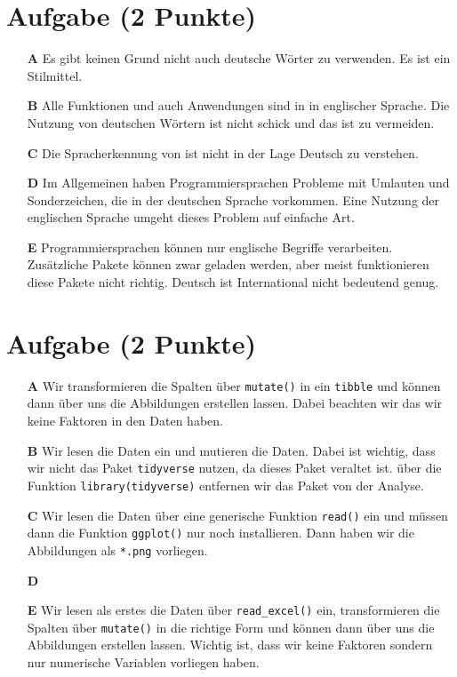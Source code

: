 \documentclass[a4paper, 9pt]{scrartcl}\usepackage[]{graphicx}\usepackage[]{xcolor}
\begin{document}
\section{Aufgabe \hfill (2 Punkte)}







\begin{enumerate}
\item [\textbf{A} \msquare] Es gibt keinen Grund nicht auch deutsche Wörter zu verwenden. Es ist ein Stilmittel.
\item [\textbf{B} \msquare] Alle Funktionen und auch Anwendungen sind in \Rlogo in englischer Sprache. Die Nutzung von deutschen Wörtern ist nicht schick und das ist zu vermeiden.
\item [\textbf{C} \msquare] Die Spracherkennung von \Rlogo ist nicht in der Lage Deutsch zu verstehen.
\item [\textbf{D} \msquare] Im Allgemeinen haben Programmiersprachen Probleme mit Umlauten und Sonderzeichen, die in der deutschen Sprache vorkommen. Eine Nutzung der englischen Sprache umgeht dieses Problem auf einfache Art.
\item [\textbf{E} \msquare] Programmiersprachen können nur englische Begriffe verarbeiten. Zusätzliche Pakete können zwar geladen werden, aber meist funktionieren diese Pakete nicht richtig. Deutsch ist International nicht bedeutend genug.
\end{enumerate}

\section{Aufgabe \hfill (2 Punkte)}







\begin{enumerate}
\item [\textbf{A} \msquare] Wir transformieren die Spalten über \texttt{mutate()} in ein \texttt{tibble} und können dann über  uns die Abbildungen erstellen lassen. Dabei beachten wir das wir keine Faktoren in den Daten haben.
\item [\textbf{B} \msquare] Wir lesen die Daten ein und mutieren die Daten. Dabei ist wichtig, dass wir nicht das Paket \texttt{tidyverse} nutzen, da dieses Paket veraltet ist. über die Funktion \texttt{library(tidyverse)} entfernen wir das Paket von der Analyse.
\item [\textbf{C} \msquare] Wir lesen die Daten über eine generische Funktion \texttt{read()} ein und müssen dann die Funktion \texttt{ggplot()} nur noch installieren. Dann haben wir die Abbildungen als \texttt{*.png} vorliegen.
\item [\textbf{D} \msquare] 
\item [\textbf{E} \msquare] Wir lesen als erstes die Daten über \texttt{read\_excel()} ein, transformieren die Spalten über \texttt{mutate()} in die richtige Form und können dann  über  uns die Abbildungen erstellen lassen. Wichtig ist, dass wir keine Faktoren sondern nur numerische Variablen vorliegen haben.
\end{enumerate}
\end{document}
